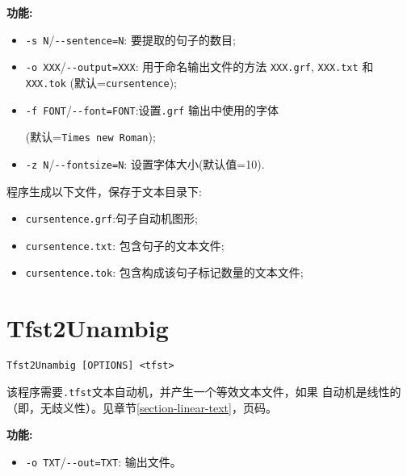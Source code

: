 \bigskip
\noindent \textbf{功能:}
\begin{itemize}
\item \verb+-s N+/\verb+--sentence=N+: 要提取的句子的数目;
  
\item \verb+-o XXX+/\verb+--output=XXX+: 用于命名输出文件的方法
	\verb+XXX.grf+, \verb+XXX.txt+ 和\verb+XXX.tok+ (默认=\verb+cursentence+);
 
\item \verb+-f FONT+/\verb+--font=FONT+:设置\verb+.grf+
 输出中使用的字体 
   
  (默认=\verb+Times new Roman+);
\item \verb+-z N+/\verb+--fontsize=N+: 设置字体大小(默认值=10).
\end{itemize}

\bigskip
\noindent 程序生成以下文件，保存于文本目录下:

\begin{itemize}
\item \verb+cursentence.grf+:句子自动机图形; 

\item \verb+cursentence.txt+: 包含句子的文本文件;

\item \verb+cursentence.tok+: 包含构成该句子标记数量的文本文件;
\end{itemize}







\section{Tfst2Unambig}
\verb+Tfst2Unambig [OPTIONS] <tfst>+

\bigskip
\noindent 该程序需要\verb$.tfst$文本自动机，并产生一个等效文本文件，如果
自动机是线性的（即，无歧义性）。见章节\ref{section-linear-text}，页码\pageref{section-linear-text}。

\bigskip
\noindent \textbf{功能:}
\begin{itemize}
\item \verb+-o TXT+/\verb+--out=TXT+: 输出文件。
\end{itemize}







